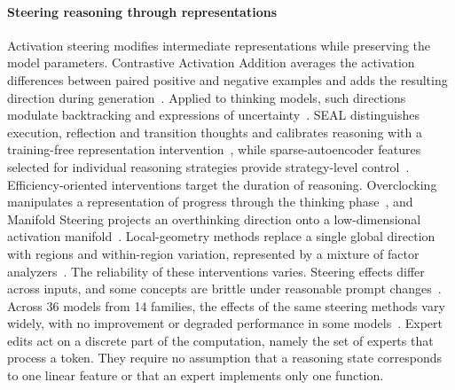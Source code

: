 \paragraph{Steering reasoning through representations}
Activation steering modifies intermediate representations while preserving the model parameters.
%
Contrastive Activation Addition averages the activation differences between paired positive and negative examples and adds the resulting direction during generation~\citep{rimsky2024caa}.
%
Applied to thinking models, such directions modulate backtracking and expressions of uncertainty~\citep{venhoff2025steering}.
%
SEAL distinguishes execution, reflection and transition thoughts and calibrates reasoning with a training-free representation intervention~\citep{chen2025seal}, while sparse-autoencoder features selected for individual reasoning strategies provide strategy-level control~\citep{fang2026controllable}.
%
Efficiency-oriented interventions target the duration of reasoning.
%
Overclocking manipulates a representation of progress through the thinking phase~\citep{eisenstadt2025overclocking}, and Manifold Steering projects an overthinking direction onto a low-dimensional activation manifold~\citep{huang2025manifold}.
%
Local-geometry methods replace a single global direction with regions and within-region variation, represented by a mixture of factor analyzers~\citep{shafran2026regions}.
%
The reliability of these interventions varies.
%
Steering effects differ across inputs, and some concepts are brittle under reasonable prompt changes~\citep{tan2024reliability}.
%
Across 36 models from 14 families, the effects of the same steering methods vary widely, with no improvement or degraded performance in some models~\citep{silva2025offcourse}.
%
Expert edits act on a discrete part of the computation, namely the set of experts that process a token.
%
They require no assumption that a reasoning state corresponds to one linear feature or that an expert implements only one function.
%


